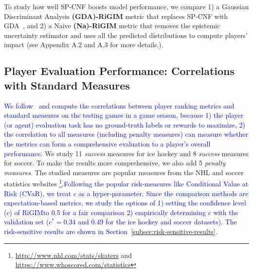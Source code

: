 \documentclass{article}
\newcommand{\confidence}{c}
\newcommand{\sys}{RiGIM}
\newcommand{\system}{\sys\;}
\begin{document}
To study how well SP-CNF boosts model performance, we compare 1) a Gaussian Discriminant Analysis {\bf (GDA)-\system} metric that replaces SP-CNF with GDA~\cite{Mukhoti2021Uncertainty}, and 2) a Naive {\bf (Na)-\system} metric that removes the epistemic uncertainty estimator 
and uses all the predicted distributions to compute players' impact (see Appendix A.2 and A.3 for more details.).


\subsection{Player Evaluation Performance: Correlations with Standard Measures}

\textcolor{blue}{We follow~\cite{Liu2018DRL,Luo2020IRL} and compute the correlations between player ranking metrics and standard measures on the testing games in a game season, because 1) the player (or agent) evaluation task has no ground-truth labels or rewards to maximize, 2) the correlation to all measures (including penalty measures) can measure whether the metrics can form a comprehensive evaluation to a player's overall performance.} We study 11 {\it success} measures for ice hockey and 8 {\it success} measures for soccer. To make the results more comprehensive, we also add 5 {\it penalty measures}. The studied measures
are popular measures from the NHL and soccer statistics websites \footnote{\url{http://www.nhl.com/stats/skaters} and  \url{https://www.whoscored.com/statistics}}.\textcolor{blue}{Following the popular risk-measures like Conditional Value at Risk (CVaR), we treat $\confidence$ as a hyper-parameter.
Since the comparison methods are expectation-based metrics, we study the options of 1) setting the confidence level ($\confidence$) of \system to 0.5 for a fair comparison 2) empirically determining $\confidence$ with the validation set ($\confidence^{*}=0.34$ and $0.49$ for the ice hockey and soccer datasets). The risk-sensitive results are shown in Section~\ref{subsec:risk-sensitive-results}.}
\end{document}
